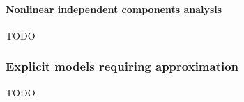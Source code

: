 \paragraph{Nonlinear independent components analysis}
TODO

\subsubsection{Explicit models requiring approximation}
\label{sec:approx}

TODO
